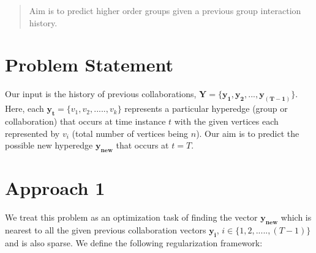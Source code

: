 \documentclass{sig-alternate}
\begin{document}

\maketitle
\begin{abstract}
Aim is to predict higher order groups given a previous group interaction history.
\end{abstract}




\section{Problem Statement}

Our input is the history of previous collaborations, $\mathbf{Y}=\{\mathbf{y_{1}},\mathbf{y_{2}}, ..., \mathbf{y_{(T-1)}} \}$. Here, each $\mathbf{y_{t}}=\{v_1,v_2, ....., v_k\}$ represents a particular hyperedge (group or collaboration) that occurs at time instance $t$ with the given vertices each represented by $v_i$ (total number of vertices being $n$). Our aim is to predict the possible new hyperedge $\mathbf{y_{new}}$ that occurs at $t=T$.

\section{Approach 1}

We treat this problem as an optimization task of finding the vector $\mathbf{y_{new}}$ which is nearest to all the given previous collaboration vectors $\mathbf{y_i}$, $i \in \{1,2,.....,(T-1)\}$ and is also sparse. We define the following regularization framework:
\end{document}
